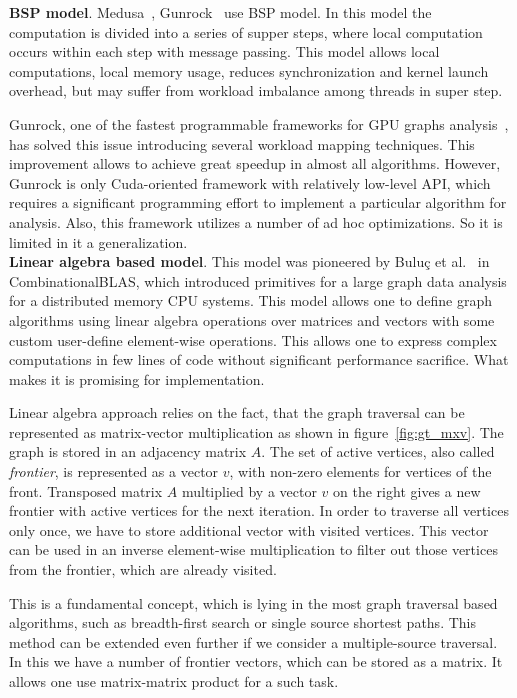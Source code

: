 \textbf{BSP model}. Medusa~\cite{article:medusa}, Gunrock~\cite{article:gunrock} use BSP model. In this model the computation is divided into a series of supper steps, where local computation occurs within each step with message passing. This model allows local computations, local memory usage, reduces synchronization and kernel launch overhead, but may suffer from workload imbalance among threads in super step.

Gunrock, one of the fastest programmable frameworks for GPU graphs analysis~\cite{article:shi_survey_graphs},  has solved this issue introducing several workload mapping techniques. This improvement allows to achieve great speedup in almost all algorithms. However, Gunrock is only Cuda-oriented framework with relatively low-level API, which requires a significant programming effort to implement a particular algorithm for analysis. Also, this framework utilizes a number of ad hoc optimizations. So it is limited in it a generalization.\\

\textbf{Linear algebra based model}. This model was pioneered by Buluç et al.~\cite{article:combblas} in CombinationalBLAS, which introduced primitives for a large graph data analysis for a distributed memory CPU systems. This model allows one to define graph algorithms using linear algebra operations over matrices and vectors with some custom user-define element-wise operations. This allows one to express complex computations in few lines of code without significant performance sacrifice. What makes it is promising for implementation. 

Linear algebra approach relies on the fact, that the graph traversal can be represented as matrix-vector multiplication as shown in figure~\ref{fig:gt_mxv}. The graph is stored in an adjacency matrix $A$. The set of active vertices, also called \textit{frontier}, is represented as a vector $v$, with non-zero elements for vertices of the front. Transposed matrix $A$ multiplied by a vector $v$ on the right gives a new frontier with active vertices for the next iteration. In order to traverse all vertices only once, we have to store additional vector with visited vertices. This vector can be used in an inverse element-wise multiplication to filter out those vertices from the frontier, which are already visited. 

This is a fundamental concept, which is lying in the most graph traversal based algorithms, such as breadth-first search or single source shortest paths. This method can be extended even further if we consider a multiple-source traversal. In this we have a number of frontier vectors, which can be stored as a matrix. It allows one use matrix-matrix product for a such task.

